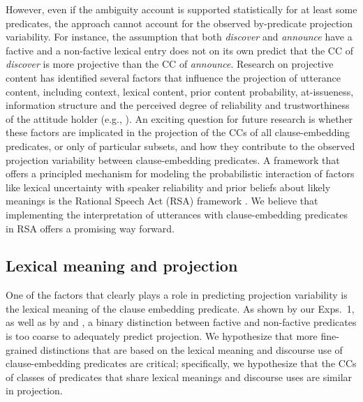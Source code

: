 \documentclass[11pt,fleqn]{article}
\newcommand{\6}{\mbox{$[\hspace*{-.6mm}[$}}
\newcommand{\9}{\mbox{$]\hspace*{-.6mm}]$}}
\begin{document}
However, even if the ambiguity account is supported statistically for at least some predicates, the approach cannot account for the observed by-predicate projection variability. For instance, the assumption that both {\em discover} and {\em announce} have a factive and a non-factive lexical entry does not on its own predict that the CC of {\em discover} is more projective than the CC of {\em announce}. Research on projective content has identified several factors that influence the projection of utterance content, including context, lexical content, prior content probability, at-issueness, information structure and the perceived degree of reliability and trustworthiness of the attitude holder (e.g., \citealt{gazdar79a,gazdar79b,beaver-belly,schlenker10,brst-salt10,best-question,abrusan2011,abrusan2016,anand-hacquard2014,cummins-rohde2015,djaerv-bacovcin-salt27,mahler-etal2020,mahler2020,tonhauser-salt26,tonhauser-guarani-variability,tbd-variability,tonhauser-etal-sub23,degen-tonhauser-openmind}). An exciting question for future research is whether these factors are implicated in the projection of the CCs of all clause-embedding predicates, or only of particular subsets, and how they contribute to the observed projection variability between clause-embedding predicates. A framework that offers a principled mechanism for modeling the probabilistic interaction of factors like lexical uncertainty with speaker reliability and prior beliefs about likely meanings  is the Rational Speech Act (RSA) framework \citep{bergen2016}. We believe that implementing the interpretation of utterances with clause-embedding predicates in RSA offers a promising way forward.

\subsection{Lexical meaning and projection}\label{s43}

One of the factors that clearly plays a role in predicting projection variability is the lexical meaning of the clause embedding predicate. As shown by our Exps.~1, as well as by \citealt{tbd-variability,demarneffe-etal-sub23} and \citealt{degen-tonhauser-openmind}, a binary distinction between factive and non-factive predicates is too coarse to adequately predict projection. We hypothesize that more fine-grained distinctions that are based on the lexical meaning and discourse use of clause-embedding predicates are critical; specifically, we hypothesize that the CCs of classes of predicates that share lexical meanings and discourse uses are similar in projection. 
\end{document}
